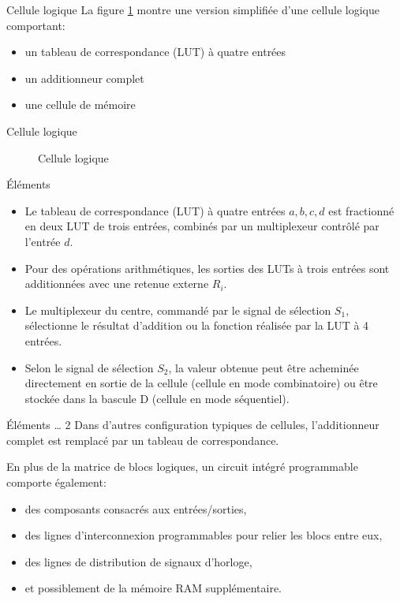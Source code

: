 \documentclass[presentation]{beamer}
\begin{document}
\begin{frame}[label={sec:orgb4b357d}]{Cellule logique}
La figure \ref{fig:orgabd025e} montre une version simplifiée d'une cellule logique comportant:
\begin{itemize}
\item un tableau de correspondance (LUT) à quatre entrées
\item un additionneur complet
\item une cellule de mémoire
\end{itemize}
\end{frame}

\begin{frame}[label={sec:orgd509ea5}]{Cellule logique}
\begin{figure}[htbp]
\centering

\caption{\label{fig:orgabd025e}Cellule logique}
\end{figure}
\end{frame}

\begin{frame}[label={sec:org7cd22bd}]{Éléments}
\begin{itemize}
\item Le tableau de correspondance (LUT) à quatre entrées \(a, b, c, d\) est fractionné en deux LUT de trois entrées, combinés par un multiplexeur contrôlé par l'entrée \(d\).

\item Pour des opérations arithmétiques, les sorties des LUTs à trois entrées sont additionnées avec une retenue externe \(R_i\).

\item Le multiplexeur du centre, commandé par le signal de sélection \(S_1\), sélectionne le résultat d'addition ou la fonction réalisée par la LUT à 4 entrées.

\item Selon le signal de sélection \(S_2\), la valeur obtenue peut être acheminée directement en sortie de la cellule (cellule en mode combinatoire) ou être stockée dans la bascule D (cellule en mode séquentiel).
\end{itemize}
\end{frame}

\begin{frame}[label={sec:org2001c95}]{Éléments \ldots{} 2}
Dans d'autres configuration typiques de cellules, l'additionneur complet est remplacé par un tableau de correspondance.

En plus de la matrice de blocs logiques, un circuit intégré programmable comporte également:
\begin{itemize}
\item des composants consacrés aux entrées/sorties,
\item des lignes d'interconnexion programmables pour relier les blocs entre eux,
\item des lignes de distribution de signaux d'horloge,
\item et possiblement de la mémoire RAM supplémentaire.
\end{itemize}
\end{frame}
\end{document}
